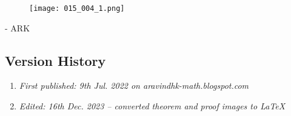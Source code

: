 \begin{figure}[H]
	\centering
	\texttt{[image: 015\_004\_1.png]}
\end{figure}

- ARK

\subsection{Version History}
\begin{enumerate}
	\item \emph{First published: 9th Jul. 2022 on aravindhk-math.blogspot.com}
	\item \emph{Edited: 16th Dec. 2023 -- converted theorem and proof images to \LaTeX}
\end{enumerate}



